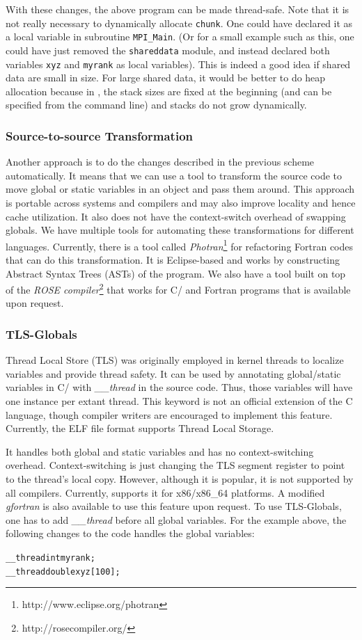 \documentclass[10pt]{article}
\begin{document}
With these changes, the above program can be made thread-safe. Note that it is
not really necessary to dynamically allocate \texttt{chunk}. One could have
declared it as a local variable in subroutine \texttt{MPI\_Main}.  (Or for a
small example such as this, one could have just removed the \texttt{shareddata}
module, and instead declared both variables \texttt{xyz} and \texttt{myrank} as
local variables). This is indeed a good idea if shared data are small in size.
For large shared data, it would be better to do heap allocation because in
\ampi{}, the stack sizes are fixed at the beginning (and can be specified from the
command line) and stacks do not grow dynamically.

\subsubsection{Source-to-source Transformation}
Another approach is to do the changes described in the previous 
scheme automatically. It means that we can use a tool to transform 
the source code to move global or static variables in an object and pass them around.
This approach is portable across systems and compilers and may also 
improve locality and hence cache utilization. It also does not have the 
context-switch overhead of swapping globals. We have multiple tools for automating 
these transformations for different languages. Currently, there is a tool 
called \emph{Photran}\footnote{http://www.eclipse.org/photran}
for refactoring Fortran codes that can do this transformation. It is Eclipse-based
and works by constructing Abstract Syntax Trees (ASTs) of the program. We
also have a tool built on top of the \emph{ROSE compiler}\footnote{http://rosecompiler.org/}
that works for C/\CC{} and Fortran programs that is available upon request.

\subsubsection{TLS-Globals}
Thread Local Store (TLS) was originally employed in kernel threads to
localize variables and provide thread safety. It can be used by annotating
global/static variables in C/\CC{} with \emph{\_\_thread} in the source code.
Thus, those variables will have one instance per extant thread. This
keyword is not an official extension of the C language, though compiler
writers are encouraged to implement this feature. Currently, the ELF file
format supports Thread Local Storage.

It handles both global and static variables and has no context-switching
 overhead. Context-switching is just changing the TLS segment register
 to point to the thread's local copy. However, although it is popular, it  
is not supported by all compilers. Currently, \charmpp{} supports it for x86/x86\_64 platforms. 
A modified \emph{gfortran} is also available to use this feature upon request.
To use TLS-Globals, one has to add \emph{\_\_thread} before all global variables. For the example
above, the following changes to the code handles the global variables:
\begin{alltt}
__thread int myrank;
__thread double xyz[100];
\end{alltt}
\end{document}
